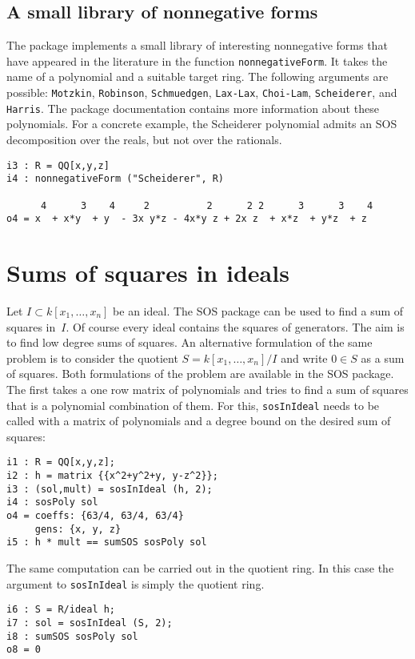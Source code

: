\documentclass[11pt]{amsart}
\theoremstyle{plain}%
\theoremstyle{definition}
\theoremstyle{remark}
\newcommand{\SOS}{\textsc{SOS}\xspace}
\begin{document}
\subsection*{A small library of nonnegative forms}
The package implements a small library of interesting nonnegative forms that have appeared in the literature in the function  \verb|nonnegativeForm|.
It takes the name of a polynomial and a suitable target ring.
The following arguments are possible: \verb|Motzkin|, \verb|Robinson|, \verb|Schmuedgen|, \verb|Lax-Lax|, \verb|Choi-Lam|, \verb|Scheiderer|, and \verb|Harris|.
The package documentation contains more information about these polynomials.
For a concrete example, the Scheiderer polynomial admits an SOS decomposition over the reals, but not over the rationals.
{\small
\begin{verbatim}
i3 : R = QQ[x,y,z]
i4 : nonnegativeForm ("Scheiderer", R)

      4      3    4     2          2      2 2      3      3    4
o4 = x  + x*y  + y  - 3x y*z - 4x*y z + 2x z  + x*z  + y*z  + z

\end{verbatim}
}

\section{Sums of squares in ideals}
Let $I \subset k[x_{1},\dots,x_{n}]$ be an ideal.  The \SOS package can be used to find a sum of squares in~$I$.
Of course every ideal contains the squares of generators.
The aim is to find low degree sums of squares.
An alternative formulation of the same problem is to consider the quotient $S = k[x_{1},\dots,x_{n}]/I$ and write $0\in S$ as a sum of squares.
Both formulations of the problem are available in the \SOS package.
The first takes a one row matrix of polynomials and tries to find a sum of squares that is a polynomial combination of them.
For this, \verb|sosInIdeal| needs to be called with a matrix of polynomials and a degree bound on the desired sum of squares:
{\small
\begin{verbatim}
i1 : R = QQ[x,y,z];
i2 : h = matrix {{x^2+y^2+y, y-z^2}};
i3 : (sol,mult) = sosInIdeal (h, 2);
i4 : sosPoly sol
o4 = coeffs: {63/4, 63/4, 63/4}
     gens: {x, y, z}
i5 : h * mult == sumSOS sosPoly sol
\end{verbatim}
}
The same computation can be carried out in the quotient ring.
In this case the argument to \verb|sosInIdeal| is simply the quotient ring.
{\small
\begin{verbatim}
i6 : S = R/ideal h;
i7 : sol = sosInIdeal (S, 2);
i8 : sumSOS sosPoly sol
o8 = 0
\end{verbatim}
}
\end{document}
